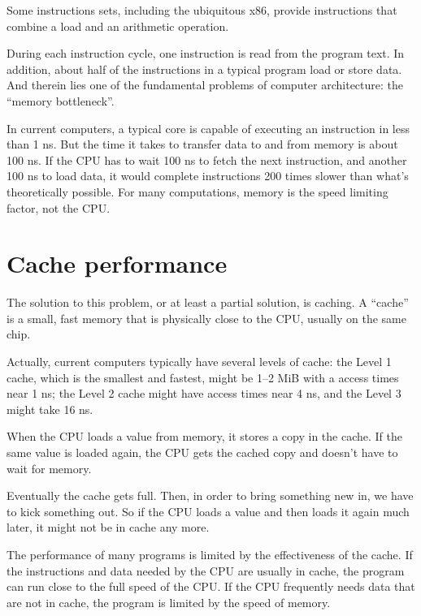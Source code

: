 \documentclass[12pt]{book}
\begin{document}
{\begin{itemize}
\end{itemize}

Some instructions sets, including the ubiquitous x86, provide
instructions that combine a load and an arithmetic operation.

During each instruction cycle, one instruction is read from the
program text.  In addition, about half of the instructions in a
typical program load or store data.  And therein
lies one of the fundamental problems of computer architecture: the
``memory bottleneck''.

In current computers, a typical core is capable of executing an instruction in less than 1 ns.  But the time it takes to transfer data to and from memory is about 100 ns.  If the CPU has to wait 100 ns to fetch the next instruction, and another 100 ns to load data, it would complete instructions 200 times slower than what's theoretically possible.  For many computations, memory is the speed limiting factor, not the CPU.


\section{Cache performance}

The solution to this problem, or at least a partial solution, is
caching.  A ``cache'' is a small, fast memory that is physically close
to the CPU, usually on the same chip.


Actually, current computers typically have several levels of cache: the Level 1 cache, which is the smallest and fastest, might be 1--2 MiB with a access times near 1 ns; the Level 2 cache might have access times near 4 ns, and the Level 3 might take 16 ns.

When the CPU loads a value from memory, it stores a copy in the cache.
If the same value is loaded again, the CPU gets the cached copy
and doesn't have to wait for memory.

Eventually the cache gets full.  Then, in order to bring something
new in, we have to kick something out.  So if the CPU loads a value
and then loads it again much later, it might not be in cache any more.

The performance of many programs is limited by the effectiveness
of the cache.  If the instructions and data needed by the CPU are usually in cache, the program can run close to the full speed of the CPU.  If the CPU
frequently needs data that are not in cache, the program is
limited by the speed of memory.

}
\end{document}
